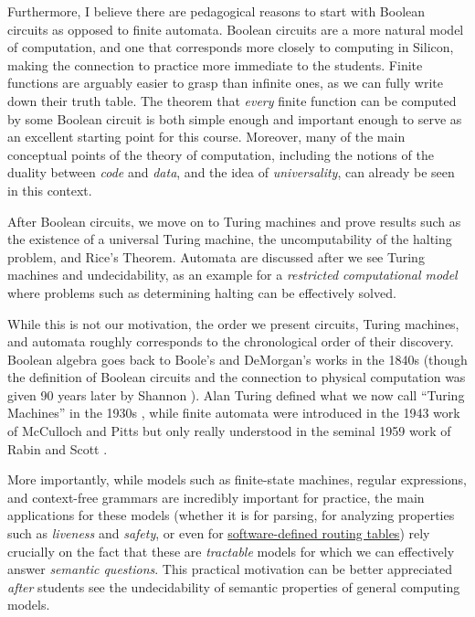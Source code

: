 Furthermore, I believe there are pedagogical reasons to start with
Boolean circuits as opposed to finite automata. Boolean circuits are a
more natural model of computation, and one that corresponds more closely
to computing in Silicon, making the connection to practice more
immediate to the students. Finite functions are arguably easier to grasp
than infinite ones, as we can fully write down their truth table. The
theorem that \emph{every} finite function can be computed by some
Boolean circuit is both simple enough and important enough to serve as
an excellent starting point for this course. Moreover, many of the main
conceptual points of the theory of computation, including the notions of
the duality between \emph{code} and \emph{data}, and the idea of
\emph{universality}, can already be seen in this context.

After Boolean circuits, we move on to Turing machines and prove results
such as the existence of a universal Turing machine, the uncomputability
of the halting problem, and Rice's Theorem. Automata are discussed after
we see Turing machines and undecidability, as an example for a
\emph{restricted computational model} where problems such as determining
halting can be effectively solved.

While this is not our motivation, the order we present circuits, Turing
machines, and automata roughly corresponds to the chronological order of
their discovery. Boolean algebra goes back to Boole's and DeMorgan's
works in the 1840s \cite{Boole1847mathematical, DeMorgan1847} (though
the definition of Boolean circuits and the connection to physical
computation was given 90 years later by Shannon \cite{Shannon1938}).
Alan Turing defined what we now call ``Turing Machines'' in the 1930s
\cite{Turing37}, while finite automata were introduced in the 1943 work
of McCulloch and Pitts \cite{McCullochPitts43} but only really
understood in the seminal 1959 work of Rabin and Scott
\cite{RabinScott59}.

More importantly, while models such as finite-state machines, regular
expressions, and context-free grammars are incredibly important for
practice, the main applications for these models (whether it is for
parsing, for analyzing properties such as \emph{liveness} and
\emph{safety}, or even for
\href{https://www.cs.cornell.edu/~kozen/Papers/NetKAT-APLAS.pdf}{software-defined
routing tables}) rely crucially on the fact that these are
\emph{tractable} models for which we can effectively answer
\emph{semantic questions}. This practical motivation can be better
appreciated \emph{after} students see the undecidability of semantic
properties of general computing models.

